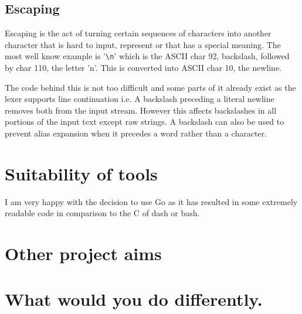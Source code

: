 \subsection{Escaping}
Escaping is the act of turning certain sequences of characters into another character that is hard to input, represent or that has a special meaning.
The most well know example is '\verb!\n!' which is the ASCII char 92, backslash, followed by char 110, the letter 'n'.
This is converted into ASCII char 10, the newline.

The code behind this is not too difficult and some parts of it already exist as the lexer supports line continuation i.e. A backslash preceding a literal newline removes both from the input stream.
However this affects backslashes in all portions of the input text except raw strings.
A backslash can also be used to prevent alias expansion when it precedes a word rather than a character.



\section{Suitability of tools}
I am very happy with the decision to use Go as it has resulted in some extremely readable code in comparison to the C of dash or bash.



\section{Other project aims}

\section{What would you do differently.}













